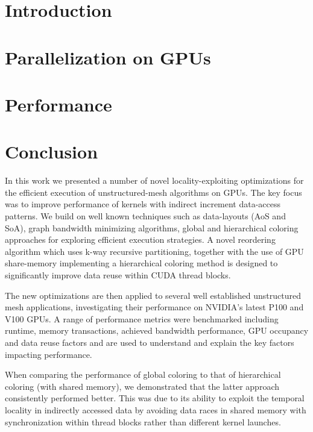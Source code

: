 \documentclass[number]{elsarticle}
\begin{document}
\section{Introduction}\label{introduction}



\section{Parallelization on GPUs}\label{parallelisation-on-gpu}



\section{Performance}\label{performance}




\section{Conclusion}\label{conclusion}

\noindent In this work we presented a number of novel locality-exploiting 
optimizations for the efficient execution of unstructured-mesh algorithms on 
GPUs. The key focus was to improve performance of kernels with indirect 
increment data-access patterns. We build on well known techniques such as 
data-layouts (AoS and SoA), graph bandwidth minimizing algorithms, global and 
hierarchical coloring approaches for exploring efficient execution strategies. 
A novel reordering algorithm which uses k-way recursive partitioning, together 
with the use of GPU share-memory implementing a hierarchical coloring method is 
designed to significantly improve data reuse within CUDA thread blocks.

The new optimizations are then applied to several well established unstructured
mesh applications, investigating their performance on NVIDIA’s latest P100
and V100 GPUs. A range of performance metrics were benchmarked including 
runtime, memory transactions, achieved bandwidth performance, GPU occupancy and 
data reuse factors and are used to understand and explain the key factors 
impacting performance.

When comparing the performance of global coloring to that of hierarchical 
coloring (with shared memory), we demonstrated that the latter approach 
consistently performed better. This was due to its ability to exploit the 
temporal locality in indirectly accessed data by avoiding data races in shared 
memory with synchronization within thread blocks rather than different kernel 
launches.
\end{document}
